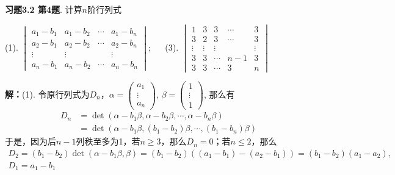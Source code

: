 
\renewcommand{\newpageorvspace}{\vspace{2em}}

\date{2021-10-29  第三次习题课}



\maketitle

{\bf 习题3.2 第4题}. 计算$n$阶行列式

(1). $\begin{vmatrix} a_1-b_1 & a_1-b_2 & \cdots & a_1-b_n \\ a_2-b_1 & a_2-b_2 & \cdots & a_2-b_n \\ \vdots & \vdots & & \vdots \\ a_n-b_1 & a_n-b_2 & \cdots & a_n-b_n \end{vmatrix}$; $\quad$ (3). $\begin{vmatrix} 1 & 3 & 3 & \cdots & 3 \\ 3 & 2 & 3 & \cdots & 3 \\ \vdots & \vdots & \vdots & & \vdots \\ 3 & 3 & \cdots & n-1 & 3 \\ 3 & 3 & \cdots & 3 & n \end{vmatrix}$

{\bf 解：}(1). 令原行列式为$D_n$，$\alpha = \begin{pmatrix} a_1 \\ \vdots \\ a_n \end{pmatrix}$, $\beta = \begin{pmatrix} 1 \\ \vdots \\ 1 \end{pmatrix}$, 那么有
\begin{align*}
D_n & = \det (\alpha-b_1\beta, \alpha-b_2\beta, \cdots, \alpha-b_n\beta) \\
& = \det (\alpha-b_1\beta, (b_1-b_2)\beta, \cdots, (b_1-b_n)\beta)
\end{align*}
于是，因为后$n-1$列秩至多为1，若$n \geqslant 3$，那么$D_n = 0$；若$n \leqslant 2$，那么
\begin{gather*}
    D_2 = (b_1-b_2) \det (\alpha-b_1\beta, \beta) = (b_1-b_2)((a_1-b_1)-(a_2-b_1)) = (b_1-b_2)(a_1-a_2), \\
    D_1 = a_1-b_1
\end{gather*}

